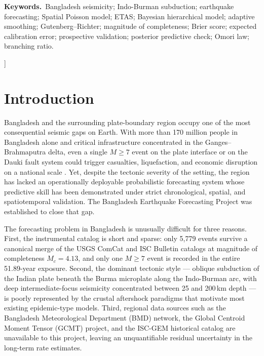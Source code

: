 \documentclass[10pt,a4paper,twocolumn]{article}
\begin{document}
\begin{@twocolumnfalse}
\vspace{0.4em}
\noindent\textbf{\color{accent}Keywords.}\,%
Bangladesh seismicity; Indo-Burman subduction; earthquake forecasting; Spatial Poisson model; ETAS; Bayesian hierarchical model; adaptive smoothing; Gutenberg--Richter; magnitude of completeness; Brier score; expected calibration error; prospective validation; posterior predictive check; Omori law; branching ratio.
\vspace{1.0em}
\end{@twocolumnfalse}
]

\onecolumn
\tableofcontents
\vspace{0.5em}
\listoffigures
\vspace{0.5em}
\listoftables
\vspace{1.0em}
\twocolumn

\section{Introduction}\label{sec:intro}

Bangladesh and the surrounding plate-boundary region occupy one of the most consequential seismic gaps on Earth. With more than 170 million people in Bangladesh alone and critical infrastructure concentrated in the Ganges--Brahmaputra delta, even a single $M\geq7$ event on the plate interface or on the Dauki fault system could trigger casualties, liquefaction, and economic disruption on a national scale \cite{steckler2008, wang2013}. Yet, despite the tectonic severity of the setting, the region has lacked an operationally deployable probabilistic forecasting system whose predictive skill has been demonstrated under strict chronological, spatial, and spatiotemporal validation. The Bangladesh Earthquake Forecasting Project was established to close that gap.

The forecasting problem in Bangladesh is unusually difficult for three reasons. First, the instrumental catalog is short and sparse: only 5{,}779 events survive a canonical merge of the USGS ComCat and ISC Bulletin catalogs at magnitude of completeness $M_c=4.13$, and only one $M\geq7$ event is recorded in the entire 51.89-year exposure. Second, the dominant tectonic style --- oblique subduction of the Indian plate beneath the Burma microplate along the Indo-Burman arc, with deep intermediate-focus seismicity concentrated between 25 and 200\,km depth --- is poorly represented by the crustal aftershock paradigms that motivate most existing epidemic-type models. Third, regional data sources such as the Bangladesh Meteorological Department (BMD) network, the Global Centroid Moment Tensor (GCMT) project, and the ISC-GEM historical catalog are unavailable to this project, leaving an unquantifiable residual uncertainty in the long-term rate estimates.
\end{document}
